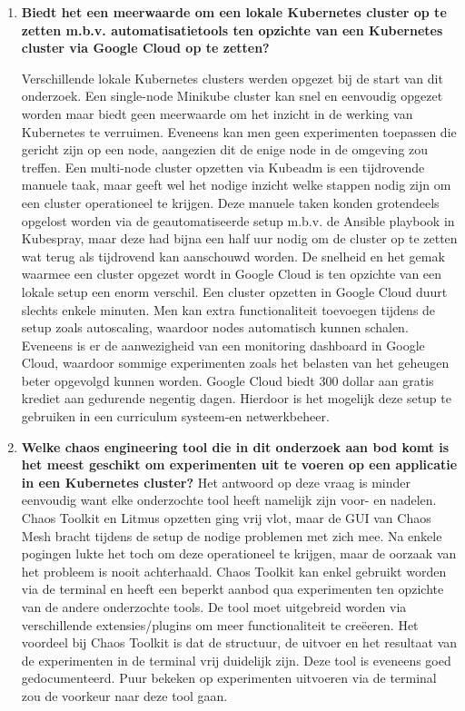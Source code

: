 \begin{enumerate}
\item {\bf Biedt het een meerwaarde om een lokale Kubernetes cluster op te zetten m.b.v. automatisatietools ten opzichte van een Kubernetes cluster via Google Cloud op te zetten?}

Verschillende lokale Kubernetes clusters werden opgezet bij de start van dit onderzoek. Een single-node Minikube cluster kan snel en eenvoudig opgezet worden maar biedt geen meerwaarde om het inzicht in de werking van Kubernetes te verruimen. Eveneens kan men geen experimenten toepassen die gericht zijn op een node, aangezien dit de enige node in de omgeving zou treffen. Een multi-node cluster opzetten via Kubeadm is een tijdrovende manuele taak, maar geeft wel het nodige inzicht welke stappen nodig zijn om een cluster operationeel te krijgen. Deze manuele taken konden grotendeels opgelost worden via de geautomatiseerde setup m.b.v. de Ansible playbook in Kubespray, maar deze had bijna een half uur nodig om de cluster op te zetten wat terug als tijdrovend kan aanschouwd worden.
\newline De snelheid en het gemak waarmee een cluster opgezet wordt in Google Cloud is ten opzichte van een lokale setup een enorm verschil. Een cluster opzetten in Google Cloud duurt slechts enkele minuten. Men kan extra functionaliteit toevoegen tijdens de setup zoals autoscaling, waardoor nodes automatisch kunnen schalen. Eveneens is er de aanwezigheid van een monitoring dashboard in Google Cloud, waardoor sommige experimenten zoals het belasten van het geheugen beter opgevolgd kunnen worden. Google Cloud biedt 300 dollar aan gratis krediet aan gedurende negentig dagen. Hierdoor is het mogelijk deze setup te gebruiken in een curriculum systeem-en netwerkbeheer.     
\newline 
\item {\bf Welke chaos engineering tool die in dit onderzoek aan bod komt is het meest geschikt om experimenten uit te voeren op een applicatie in een Kubernetes cluster?}
\newline Het antwoord op deze vraag is minder eenvoudig want elke onderzochte tool heeft namelijk zijn voor- en nadelen. Chaos Toolkit en Litmus opzetten ging vrij vlot, maar de GUI van Chaos Mesh bracht tijdens de setup de nodige problemen met zich mee. Na enkele pogingen lukte het toch om deze operationeel te krijgen, maar de oorzaak van het probleem is nooit achterhaald. 
\newline Chaos Toolkit kan enkel gebruikt worden via de terminal en heeft een beperkt aanbod qua experimenten ten opzichte van de andere onderzochte tools. De tool moet uitgebreid worden via verschillende extensies/plugins om meer functionaliteit te creëeren. Het voordeel bij Chaos Toolkit is dat de structuur, de uitvoer en het resultaat van de experimenten in de terminal vrij duidelijk zijn. Deze tool is eveneens goed gedocumenteerd. Puur bekeken op experimenten uitvoeren via de terminal zou de voorkeur naar deze tool gaan.

\end{enumerate}
